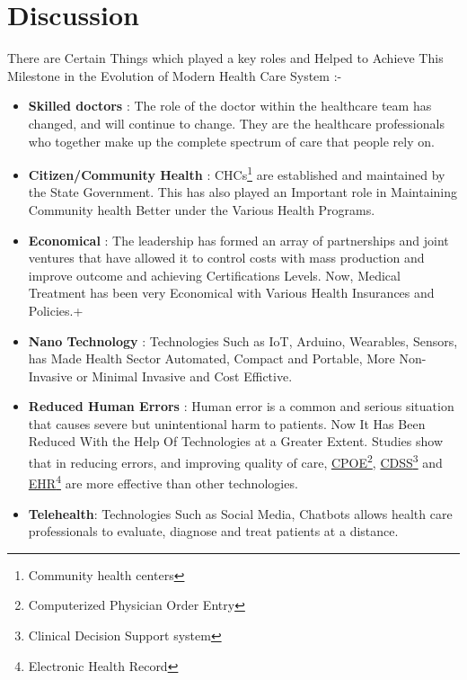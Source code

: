 \documentclass[12pt]{article}
\begin{document}
\section{Discussion}
There are Certain Things which played a key roles and Helped to Achieve This Milestone in the Evolution of Modern Health Care System :-
\begin{itemize}
\vspace{-0.8mm}
\item[\ding{234}]\textbf{Skilled doctors} : The role of the doctor within the healthcare team has changed, and will continue to change. They are the healthcare professionals who together make up the complete spectrum of care that people rely on. 

\item[\ding{234}]\textbf{Citizen/Community Health} : CHCs\footnote{Community health centers} are established and maintained by the State Government. This has also played an Important role in Maintaining Community health Better under the Various Health Programs.

\item[\ding{234}]\textbf{Economical} : The leadership has formed an array of partnerships and joint ventures that have allowed it to control costs with mass production and improve outcome and achieving Certifications Levels. Now, Medical Treatment has been very Economical with Various Health Insurances and Policies.+
\item[\ding{234}]\textbf{Nano Technology} : Technologies Such as IoT, Arduino, Wearables, Sensors, has Made Health Sector Automated, Compact and Portable, More Non-Invasive or Minimal Invasive and Cost Effictive. 

\item[\ding{234}]\textbf{Reduced Human Errors} : Human error is a common and serious situation that causes severe but unintentional harm to patients. Now It Has Been Reduced With the Help Of Technologies at a Greater Extent. Studies show that in reducing errors, and improving quality of care, \href {https://searchhealthit.techtarget.com/definition/computerized-physician-order-entry-CPOE}{CPOE}\footnote{Computerized Physician Order Entry},  \href {https://searchhealthit.techtarget.com/definition/clinical-decision-support-system-CDSS}{CDSS}\footnote{Clinical Decision Support system} and \href{https://en.wikipedia.org/wiki/Electronic_health_record}{EHR}\footnote{Electronic Health Record} are more effective than other technologies. 

\item[\ding{234}]\textbf{Telehealth}: Technologies Such as Social Media, Chatbots allows health care professionals to evaluate, diagnose and treat patients at a distance. 


\end{itemize}
\end{document}
